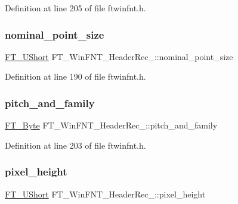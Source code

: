 Definition at line 205 of file ftwinfnt.\+h.

\mbox{\label{struct_f_t___win_f_n_t___header_rec___a98fd9a9f31cdbdfa570fba3e0094dfdc}} 
\subsubsection{\texorpdfstring{nominal\_point\_size}{nominal\_point\_size}}
{\footnotesize\ttfamily \mbox{\hyperlink{fttypes_8h_a937f6c17cf5ffd09086d8610c37b9f58}{F\+T\+\_\+\+U\+Short}} F\+T\+\_\+\+Win\+F\+N\+T\+\_\+\+Header\+Rec\+\_\+\+::nominal\+\_\+point\+\_\+size}



Definition at line 190 of file ftwinfnt.\+h.

\mbox{\label{struct_f_t___win_f_n_t___header_rec___a2474459426a7e81d6e32ebe7c0cf4e36}} 
\subsubsection{\texorpdfstring{pitch\_and\_family}{pitch\_and\_family}}
{\footnotesize\ttfamily \mbox{\hyperlink{fttypes_8h_a51f26183ca0c9f4af958939648caeccd}{F\+T\+\_\+\+Byte}} F\+T\+\_\+\+Win\+F\+N\+T\+\_\+\+Header\+Rec\+\_\+\+::pitch\+\_\+and\+\_\+family}



Definition at line 203 of file ftwinfnt.\+h.

\mbox{\label{struct_f_t___win_f_n_t___header_rec___ab842eb0d082ccdc29d5fde435c0c8eb4}} 
\subsubsection{\texorpdfstring{pixel\_height}{pixel\_height}}
{\footnotesize\ttfamily \mbox{\hyperlink{fttypes_8h_a937f6c17cf5ffd09086d8610c37b9f58}{F\+T\+\_\+\+U\+Short}} F\+T\+\_\+\+Win\+F\+N\+T\+\_\+\+Header\+Rec\+\_\+\+::pixel\+\_\+height}



